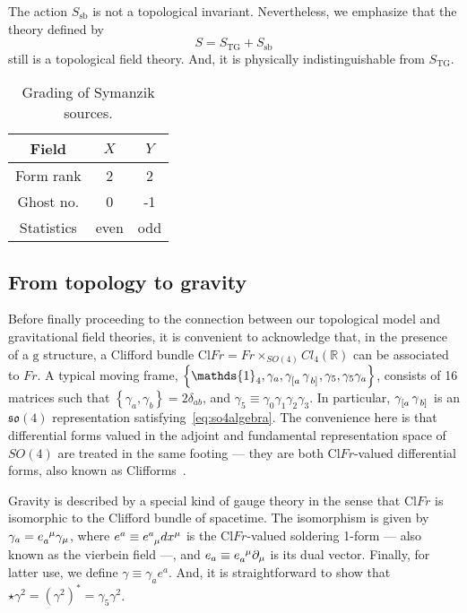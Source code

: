 \documentclass[../main.tex]{subfiles}
\begin{document}
The action $S_{\text{sb}}$ is not a topological invariant. Nevertheless, we emphasize that the theory defined by
\begin{equation}
  \label{eq:tg+sb}
  S=S_{\text{TG}}+S_{\text{sb}}
\end{equation}
still is a topological field theory. And, it is physically indistinguishable from $S_{\text{TG}}$.
\begin{table}[htpb]
  \caption{Grading of Symanzik sources.}%
  \label{tab:grading2}
  \begin{tabular}{ccc}
    \toprule
    Field      & $X$  & $Y$ \\
    \midrule
    Form rank  & 2    & 2   \\
    Ghost no.  & 0    & -1  \\
    Statistics & even & odd \\
    \bottomrule
  \end{tabular}
\end{table}

\subsection{From topology to gravity}%
\label{ssec:from_top_to_grav;sec:top_grav}

Before finally proceeding to the connection between our topological model and gravitational field theories, it is convenient to acknowledge that, in the presence of a $ \mathrm{g} $ structure, a Clifford bundle $ \mathrm{Cl} Fr= Fr \times_{SO(4)}Cl_4 \left( \mathbb{R} \right)$ can be associated to $ Fr $. A typical moving frame, $\left\{ \mathds{1}_4, \gamma_a, \tensor{ \gamma }{ _{ \left[ a \right. } } \tensor{ \gamma }{ _{ \left. b \right] } }, \gamma_5, \gamma_5 \gamma_a \right\}$, consists of 16 matrices such that $ \left\{ \gamma_a, \gamma_b \right\} = 2 \delta_{ab}$, and $\gamma_5 \equiv \gamma_0 \gamma_1 \gamma_2 \gamma_3 $. In particular, $\tensor{ \gamma }{ _{ \left[ a \right. } } \tensor{ \gamma }{ _{ \left. b \right] } }$ is an $\mathfrak{so}\left( 4 \right)$ representation satisfying~\eqref{eq:so4algebra}. The convenience here is that differential forms valued in the adjoint and fundamental representation space of $SO(4)$ are treated in the same footing --- they are both $ \mathrm{Cl}Fr $-valued differential forms, also known as Clifforms~\cite{benn1987a,mielke2001a,mielke2017a}. %

Gravity is described by a special kind of gauge theory in the sense that $ \mathrm{Cl}Fr $ is isomorphic to the Clifford bundle of spacetime. The isomorphism is given by $\gamma_a = \tensor{ e }{ _a^\mu } \gamma_\mu $, where $e^a \equiv \tensor{ e }{ ^a_\mu } dx^\mu $ is the $\mathrm{Cl}Fr$-valued soldering 1-form --- also known as the vierbein field ---, and $ e_a \equiv \tensor{ e }{ _a^\mu }\partial_{ \mu }$ is its dual vector. Finally, for latter use, we define $ \gamma \equiv \gamma_a e^a $. And, it is straightforward to show that $\star \gamma^2 = {\left( \gamma^2 \right)}^*= \gamma_5 \gamma^2$.
\end{document}

